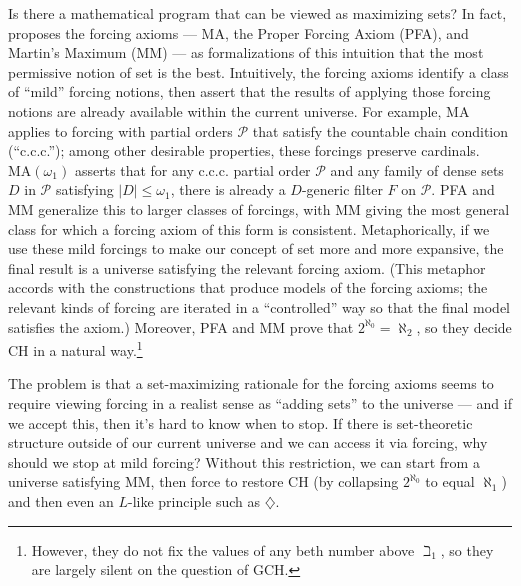 \documentclass[letterpaper,12pt]{article}
\begin{document}
Is there a mathematical program that can be viewed as maximizing sets? In fact, \cite{magidor2012some} proposes the forcing axioms --- MA, the Proper Forcing Axiom (PFA), and Martin's Maximum (MM) --- as formalizations of this intuition that the most permissive notion of set is the best. Intuitively, the forcing axioms identify a class of ``mild'' forcing notions, then assert that the results of applying those forcing notions are already available within the current universe. For example, MA applies to forcing with partial orders $\mathcal{P}$ that satisfy the countable chain condition (``c.c.c.''); among other desirable properties, these forcings preserve cardinals. $\mathrm{MA}(\omega_1)$ asserts that for any c.c.c. partial order $\mathcal{P}$ and any family of dense sets $D$ in $\mathcal{P}$ satisfying $|D| \leq \omega_1$, there is already a $D$-generic filter $F$ on $\mathcal{P}$. PFA and MM generalize this to larger classes of forcings, with MM giving the most general class for which a forcing axiom of this form is consistent. Metaphorically, if we use these mild forcings to make our concept of set more and more expansive, the final result is a universe satisfying the relevant forcing axiom. (This metaphor accords with the constructions that produce models of the forcing axioms; the relevant kinds of forcing are iterated in a ``controlled'' way so that the final model satisfies the axiom.) Moreover, PFA and MM prove that $2^{\aleph_0} = \aleph_2$, so they decide CH in a natural way.\footnote{However, they do not fix the values of any beth number above $\beth_1$, so they are largely silent on the question of GCH.}

The problem is that a set-maximizing rationale for the forcing axioms seems to require viewing forcing in a realist sense as ``adding sets'' to the universe --- and if we accept this, then it's hard to know when to stop. If there is set-theoretic structure outside of our current universe and we can access it via forcing, why should we stop at mild forcing? Without this restriction, we can start from a universe satisfying MM, then force to restore CH (by collapsing $2^{\aleph_0}$ to equal $\aleph_1$) and then even an $L$-like principle such as $\diamondsuit$.
\end{document}
